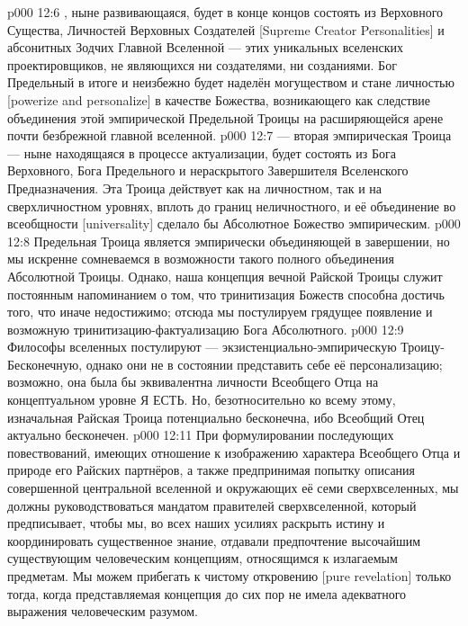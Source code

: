 \vs p000 12:6 \bibnobreakspace {}, ныне развивающаяся, будет в конце концов состоять из Верховного Существа, Личностей Верховных Создателей [Supreme Creator Personalities] и абсонитных Зодчих Главной Вселенной --- этих уникальных вселенских проектировщиков, не являющихся ни создателями, ни созданиями. Бог Предельный в итоге и неизбежно будет наделён могуществом и стане личностью [powerize and personalize] в качестве Божества, возникающего как следствие объединения этой эмпирической Предельной Троицы на расширяющейся арене почти безбрежной главной вселенной.
\vs p000 12:7 \bibnobreakspace {} --- вторая эмпирическая Троица --- ныне находящаяся в процессе актуализации, будет состоять из Бога Верховного, Бога Предельного и нераскрытого Завершителя Вселенского Предназначения. Эта Троица действует как на личностном, так и на сверхличностном уровнях, вплоть до границ неличностного, и её объединение во всеобщности [universality] сделало бы Абсолютное Божество эмпирическим.
\vs p000 12:8 \pc Предельная Троица является эмпирически объединяющей в завершении, но мы искренне сомневаемся в возможности такого полного объединения Абсолютной Троицы. Однако, наша концепция вечной Райской Троицы служит постоянным напоминанием о том, что тринитизация Божеств способна достичь того, что иначе недостижимо; отсюда мы постулируем грядущее появление  и возможную тринитизацию\hyp{}фактуализацию Бога Абсолютного.
\vs p000 12:9 \pc Философы вселенных постулируют  --- экзистенциально\hyp{}эмпирическую Троицу\hyp{}Бесконечную, однако они не в состоянии представить себе её персонализацию; возможно, она была бы эквивалентна личности Всеобщего Отца на концептуальном уровне Я ЕСТЬ. Но, безотносительно ко всему этому, изначальная Райская Троица потенциально бесконечна, ибо Всеобщий Отец актуально бесконечен.
\vs p000 12:11 При формулировании последующих повествований, имеющих отношение к изображению характера Всеобщего Отца и природе его Райских партнёров, а также предпринимая попытку описания совершенной центральной вселенной и окружающих её семи сверхвселенных, мы должны руководствоваться мандатом правителей сверхвселенной, который предписывает, чтобы мы, во всех наших усилиях раскрыть истину и координировать существенное знание, отдавали предпочтение высочайшим существующим человеческим концепциям, относящимся к излагаемым предметам. Мы можем прибегать к чистому откровению [pure revelation] только тогда, когда представляемая концепция до сих пор не имела адекватного выражения человеческим разумом.
